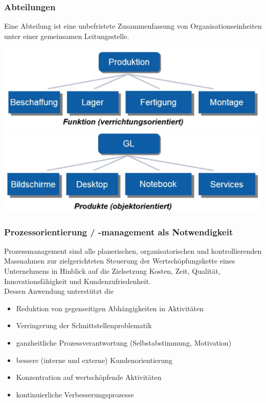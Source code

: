 \subsubsection{Abteilungen}
Eine Abteilung ist eine unbefristete Zusammenfassung von Organisationseinheiten unter einer gemeinsamen Leitungsstelle.
\begin{multicols}{2}
	\includegraphics[width=1\linewidth]{images/abteilung_1}
	\includegraphics[width=1\linewidth]{images/abteilung_2}
\end{multicols}

\subsubsection{Prozessorientierung / -management als Notwendigkeit}
Prozessmanagement sind alle planerischen, organisatorischen und kontrollierenden Massnahmen zur zielgerichteten Steuerung der Wertschöpfungskette eines Unternehmens in Hinblick auf die Zielsetzung Kosten, Zeit, Qualität, Innovationsfähigkeit und Kundenzufriedenheit. \\
Dessen Anwendung unterstützt die
\begin{itemize}
	\item Reduktion von gegenseitigen Abhängigkeiten in Aktivitäten
	\item Verringerung der Schnittstellenproblematik
	\item ganzheitliche Prozessverantwortung (Selbstabstimmung, Motivation)
	\item bessere (interne und externe) Kundenorientierung
	\item Konzentration auf wertschöpfende Aktivitäten
	\item kontinuierliche Verbesserungsprozesse
\end{itemize}

